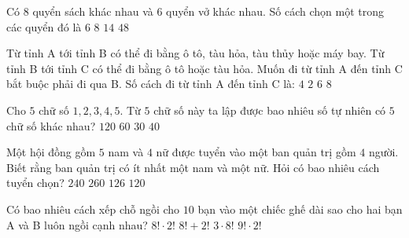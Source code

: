\begin{ex}%
	Có $8$ quyển sách khác nhau và $6$ quyển vở khác nhau. Số cách chọn một trong các quyển đó là
	\choice
	{$6$}
	{$8$}
	{\True $14$}
	{$48$}
\end{ex}
\begin{ex}%
	Từ tỉnh A tới tỉnh B có thể đi bằng ô tô, tàu hỏa, tàu thủy hoặc máy bay. Từ tỉnh B tới tỉnh C có thể đi bằng ô tô hoặc tàu hỏa. Muốn đi từ tỉnh A đến tỉnh C bắt buộc phải đi qua B. Số cách đi từ tỉnh A đến tỉnh C là:
	\choice
	{$4$}
	{$2$}
	{$6$}
	{\True $8$}
\end{ex}
\begin{ex}%
	Cho $5$ chữ số $1, 2, 3, 4, 5$. Từ $5$ chữ số này ta lập được bao nhiêu số tự nhiên có $5$ chữ số khác nhau?
	\choice
	{\True $120$}
	{$60$}
	{$30$}
	{$40$}
\end{ex}
\begin{ex}%
	Một hội đồng gồm $5$ nam và $4$ nữ được tuyển vào một ban quản trị gồm $4$ người. Biết rằng ban quản trị có ít nhất một nam và một nữ. Hỏi có bao nhiêu cách tuyển chọn?
	\choice
	{$240$}
	{$260$}
	{$126$}
	{\True $120$}
\end{ex}
\begin{ex}%
	Có bao nhiêu cách xếp chỗ ngồi cho $10$ bạn vào một chiếc ghế dài sao cho hai bạn A và B luôn ngồi cạnh nhau?
	\choice
	{$8!\cdot 2!$}
	{$8!+2!$}
	{$3 \cdot 8!$}
	{\True $9!\cdot 2!$}
\end{ex}
